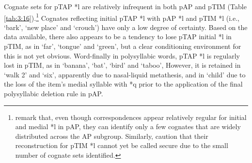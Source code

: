 Cognate sets for pTAP *l are relatively infrequent in both pAP and pTIM (Table \ref{tab:3:16}).\footnote{\citet{HoltonRobinsonTV} remark that, even though correspondences appear relatively regular for initial and medial *l in pAP, they can identify only a few cognates that are widely distributed across the AP subgroup. Similarly, \citet{SchapperEtAl2012} caution that their reconstruction for pTIM *l cannot yet be called secure due to the small number of cognate sets identified.} Cognates reflecting initial pTAP *l with pAP *l and pTIM *l (i.e., `bark', `new place' and `crouch') have only a low degree of certainty. Based on the data available, there also appears to be a tendency to lose pTAP initial *l in pTIM, as in `far', `tongue' and `green', but a clear conditioning environment for this is not yet obvious. Word-finally in polysyllabic words, pTAP *l is regularly lost in pTIM, as in `banana', `bat', `bird' and `taboo', However, it is retained in `walk 2' and `six', apparently due to nasal-liquid metathesis, and in `child' due to the loss of the item's medial syllable with *q prior to the application of the final polysyllabic deletion rule in pAP.
 

